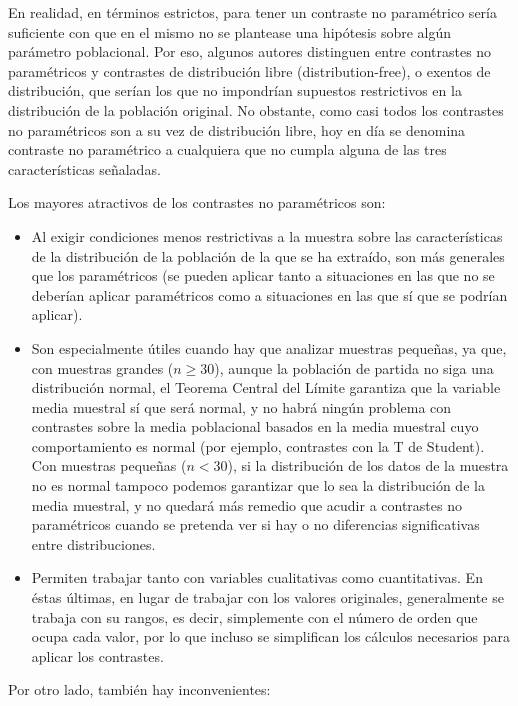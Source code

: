 En realidad, en términos estrictos, para tener un contraste no paramétrico sería suficiente con que en el mismo no se plantease una
hipótesis sobre algún parámetro poblacional. Por eso, algunos autores distinguen entre contrastes no paramétricos y contrastes de
distribución libre (distribution-free), o exentos de distribución, que serían los que no impondrían supuestos restrictivos en la
distribución de la población original. No obstante, como casi todos los contrastes no paramétricos son a su vez de distribución libre, hoy
en día se denomina contraste no paramétrico a cualquiera que no cumpla alguna de las tres características señaladas.

Los mayores atractivos de los contrastes no paramétricos son:

\begin{itemize}
\item Al exigir condiciones menos restrictivas a la muestra sobre las características de la distribución de la población de la que se ha
extraído, son más generales que los paramétricos (se pueden aplicar tanto a situaciones en las que no se deberían aplicar paramétricos como
a situaciones en las que sí que se podrían aplicar).

\item Son especialmente útiles cuando hay que analizar muestras pequeñas, ya que, con muestras grandes ($n\geq 30$), aunque la población de
partida no siga una distribución normal, el Teorema Central del Límite garantiza que la variable media muestral sí que será normal, y no
habrá ningún problema con contrastes sobre la media poblacional basados en la media muestral cuyo comportamiento es normal (por ejemplo,
contrastes con la T de Student). Con muestras pequeñas ($n<30$), si la distribución de los datos de la muestra no es normal tampoco podemos
garantizar que lo sea la distribución de la media muestral, y no quedará más remedio que acudir a contrastes no paramétricos cuando se
pretenda ver si hay o no diferencias significativas entre distribuciones.

\item  Permiten trabajar tanto con variables cualitativas como cuantitativas. En éstas últimas, en lugar de trabajar con los valores
originales, generalmente se trabaja con su rangos, es decir, simplemente con el número de orden que ocupa cada valor, por lo que incluso se
simplifican los cálculos necesarios para aplicar los contrastes.
\end{itemize}

Por otro lado, también hay inconvenientes:

